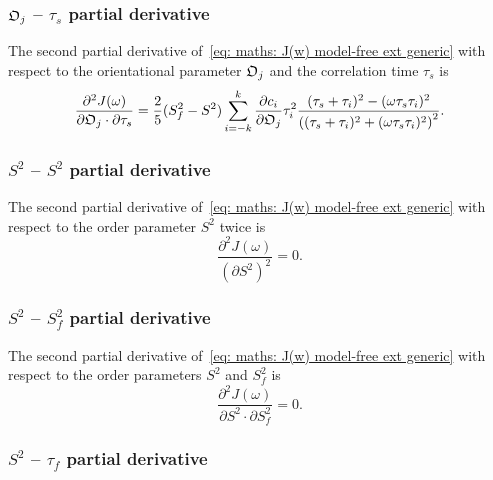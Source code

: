 \subsubsection{$\mathfrak{O}_j$ -- $\tau_s$ partial derivative}

The second partial derivative of~\eqref{eq: maths: J(w) model-free ext generic} with respect to the orientational parameter $\mathfrak{O}_j$ and the correlation time $\tau_s$ is
\begin{equation}
    \frac{\partial^2 J(\omega)}{\partial \mathfrak{O}_j \cdot \partial \tau_s} = \frac{2}{5} (S^2_f - S^2) \sum_{i=-k}^k
        \frac{\partial c_i}{\partial \mathfrak{O}_j} \tau_i^2
        \frac{(\tau_s + \tau_i)^2 - (\omega \tau_s \tau_i)^2}{\left((\tau_s + \tau_i)^2 + (\omega \tau_s \tau_i)^2 \right)^2}.
\end{equation}



\subsubsection{$S^2$ -- $S^2$ partial derivative}

The second partial derivative of~\eqref{eq: maths: J(w) model-free ext generic} with respect to the order parameter $S^2$ twice is
\begin{equation}
    \frac{\partial^2 J(\omega)}{(\partial S^2)^2} = 0.
\end{equation}



\subsubsection{$S^2$ -- $S^2_f$ partial derivative}

The second partial derivative of~\eqref{eq: maths: J(w) model-free ext generic} with respect to the order parameters $S^2$ and $S^2_f$ is
\begin{equation}
    \frac{\partial^2 J(\omega)}{\partial S^2 \cdot \partial S^2_f} = 0.
\end{equation}



\subsubsection{$S^2$ -- $\tau_f$ partial derivative}

